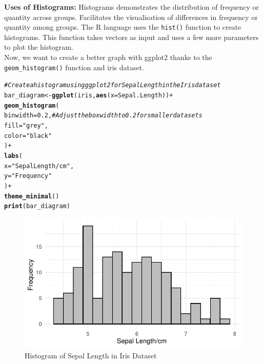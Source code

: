 \documentclass{article}\usepackage[]{graphicx}\usepackage[]{xcolor}
\makeatletter
\def\maxwidth{ %
  \ifdim\Gin@nat@width>\linewidth
    \linewidth
  \else
    \Gin@nat@width
  \fi
}
\newcommand{\hlnum}[1]{\textcolor[rgb]{0.686,0.059,0.569}{#1}}%
\newcommand{\hlstr}[1]{\textcolor[rgb]{0.192,0.494,0.8}{#1}}%
\newcommand{\hlcom}[1]{\textcolor[rgb]{0.678,0.584,0.686}{\textit{#1}}}%
\newcommand{\hlopt}[1]{\textcolor[rgb]{0,0,0}{#1}}%
\newcommand{\hlstd}[1]{\textcolor[rgb]{0.345,0.345,0.345}{#1}}%
\newcommand{\hlkwb}[1]{\textcolor[rgb]{0.69,0.353,0.396}{#1}}%
\newcommand{\hlkwc}[1]{\textcolor[rgb]{0.333,0.667,0.333}{#1}}%
\newcommand{\hlkwd}[1]{\textcolor[rgb]{0.737,0.353,0.396}{\textbf{#1}}}%
\newenvironment{kframe}{%
 \def\at@end@of@kframe{}%
 \ifinner\ifhmode%
  \def\at@end@of@kframe{\end{minipage}}%
  \begin{minipage}{\columnwidth}%
 \fi\fi%
 \def\FrameCommand##1{\hskip\@totalleftmargin \hskip-\fboxsep
 \colorbox{shadecolor}{##1}\hskip-\fboxsep
     \hskip-\linewidth \hskip-\@totalleftmargin \hskip\columnwidth}%
 \MakeFramed {\advance\hsize-\width
   \@totalleftmargin\z@ \linewidth\hsize
   \@setminipage}}%
 {\par\unskip\endMakeFramed%
 \at@end@of@kframe}
\newenvironment{knitrout}{}{} %
\makeatother
\begin{document}
\noindent
\textbf{Uses of Histograms:}
Histograms demonstrates the distribution of frequency or quantity across groups. Facilitates the visualisation of differences in frequency or quantity among groups. The R language uses the \texttt{hist()} function to create histograms. This function takes vectors as input and uses a few more parameters to plot the histogram.\\

\noindent
Now, we want to create a better graph with ggplot2 thanks to the \texttt{geom\_histogram()} function and iris dataset.
\begin{knitrout}\scriptsize
{}\color{fgcolor}\begin{kframe}
\begin{alltt}
\hlcom{#Create a histogram using ggplot2 for Sepal Length in the Iris dataset}
\hlstd{bar_diagram} \hlkwb{<-} \hlkwd{ggplot}\hlstd{(iris,} \hlkwd{aes}\hlstd{(}\hlkwc{x} \hlstd{= Sepal.Length))} \hlopt{+}
  \hlkwd{geom_histogram}\hlstd{(}
    \hlkwc{binwidth} \hlstd{=} \hlnum{0.2}\hlstd{,}  \hlcom{# Adjust the box width to 0.2 for smaller data sets}
    \hlkwc{fill} \hlstd{=} \hlstr{"grey"}\hlstd{,}
    \hlkwc{color} \hlstd{=} \hlstr{"black"}
  \hlstd{)} \hlopt{+}
  \hlkwd{labs}\hlstd{(}
    \hlkwc{x} \hlstd{=} \hlstr{"Sepal Length/cm"}\hlstd{,}
    \hlkwc{y} \hlstd{=} \hlstr{"Frequency"}
  \hlstd{)} \hlopt{+}
  \hlkwd{theme_minimal}\hlstd{()}
\hlkwd{print}\hlstd{(bar_diagram)}
\end{alltt}
\end{kframe}\begin{figure}[H]

{\centering \includegraphics[width=\maxwidth]{figure/beamer-hist3-1} 

}

\caption[Histogram of Sepal Length in Iris Dataset]{Histogram of Sepal Length in Iris Dataset}\label{fig:hist3}
\end{figure}

\end{knitrout}
\end{document}
